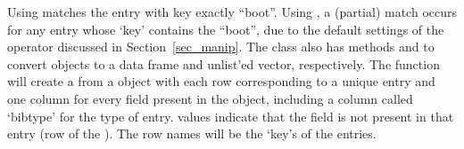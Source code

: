 \documentclass[article]{jss}\usepackage[]{graphicx}\usepackage[]{color}
\newcommand{\bt}{\`{}}
\begin{document}
Using  matches the entry with key exactly ``boot''.  Using , a (partial) match occurs for any entry whose `key' contains the  ``boot'', due to the default settings of the \code{\bt[\bt} operator discussed in Section~\ref{sec_manip}.
The  class also has methods  and  to convert  objects to a data frame and unlist'ed vector, respectively.  The function  will create  a  from a  object with each row corresponding to a unique entry and one column for every field present in the  object, including a column called `bibtype' for the type of entry.   values indicate that the field is not present in that entry (row of the ).  The row names will be the `key's of the entries.
\end{document}
